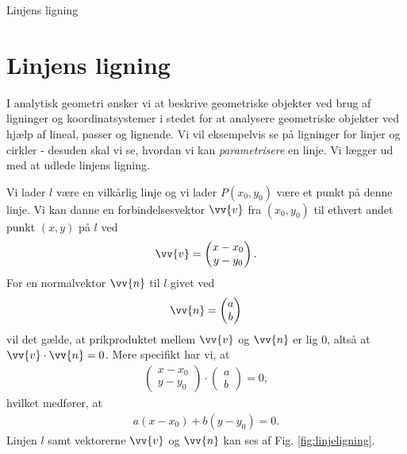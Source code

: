 
\begin{center}
\Huge
Linjens ligning
\end{center}


\section*{Linjens ligning}

I analytisk geometri ønsker vi at beskrive geometriske objekter ved brug af ligninger og koordinatsystemer i stedet for at analysere geometriske objekter ved hjælp af lineal, passer og lignende. Vi vil eksempelvis se på ligninger for linjer og cirkler - desuden skal vi se, hvordan vi kan \textit{parametrisere} en linje. Vi lægger ud med at udlede linjens ligning.

Vi lader $l$ være en vilkårlig linje og vi lader $P(x_0,y_0)$ være et punkt på denne linje. Vi kan danne en forbindelsesvektor $\vv{v}$ fra $(x_0,y_0)$ til ethvert andet punkt $(x,y)$ på $l$ ved
\begin{align}\label{eq:eq1}
\vv{v} = \begin{pmatrix}
x-x_0\\y-y_0
\end{pmatrix}.
\end{align}
For en normalvektor $\vv{n}$ til $l$ givet ved
\begin{align*}
	\vv{n} = 
	\begin{pmatrix}
		a\\b
	\end{pmatrix}
\end{align*}
vil det gælde, at prikproduktet mellem $\vv{v}$ og $\vv{n}$ er lig 0, altså at $\vv{v}\cdot \vv{n} = 0$. Mere specifikt har vi, at 
\begin{align*}
	\begin{pmatrix}
		x-x_0\\ y-y_0
	\end{pmatrix} \cdot 
	\begin{pmatrix}
		a \\ b
	\end{pmatrix} = 0,
\end{align*}
hvilket medfører, at 
\begin{align*}
a(x-x_0) + b(y-y_0) = 0.
\end{align*}
Linjen $l$ samt vektorerne $\vv{v}$ og $\vv{n}$ kan ses af Fig. \ref{fig:linjeligning}.
